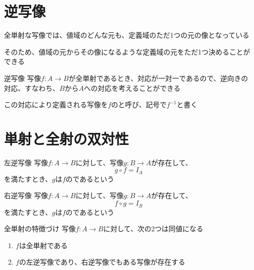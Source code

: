 \documentclass[../../../topic_mapping]{subfiles}
\begin{document}
\sectionline
\section{逆写像}

全単射な写像では、値域のどんな元も、定義域のただ1つの元の像となっている

そのため、値域の元からその像になるような定義域の元をただ1つ決めることができる

\begin{definition}{逆写像}
  写像$f\colon A \to B$が全単射であるとき、対応が一対一であるので、逆向きの対応、すなわち、$B$から$A$への対応を考えることができる

  この対応により定義される写像を$f$のと呼び、記号で$f^{-1}$と書く
\end{definition}

\sectionline
\section{単射と全射の双対性}

\begin{definition}{左逆写像}
  写像$f\colon A \to B$に対して、写像$g\colon B \to A$が存在して、
  \begin{equation*}
    g \circ f = I_A
  \end{equation*}
  を満たすとき、$g$は$f$のであるという
\end{definition}

\begin{definition}{右逆写像}
  写像$f\colon A \to B$に対して、写像$g\colon B \to A$が存在して、
  \begin{equation*}
    f \circ g = I_B
  \end{equation*}
  を満たすとき、$g$は$f$のであるという
\end{definition}

\begin{theorem}{全単射の特徴づけ}
  写像$f\colon A \to B$に対して、次の2つは同値になる
  \begin{enumerate}
    \item $f$は全単射である
    \item $f$の左逆写像であり、右逆写像でもある写像が存在する
  \end{enumerate}
\end{theorem}

\end{document}
